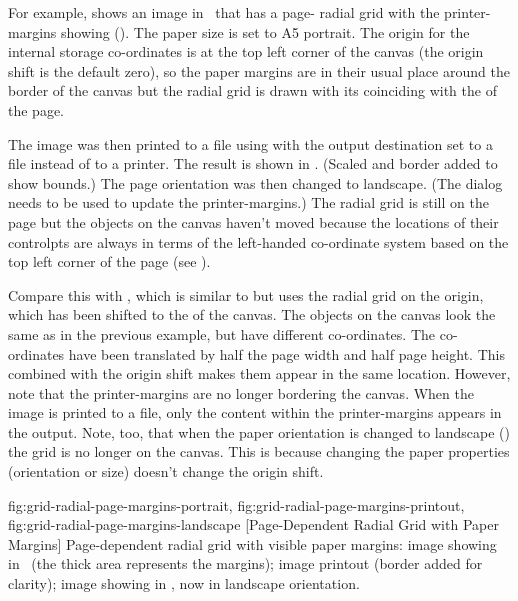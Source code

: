 For example,  shows an image
in \FlowframTk\ that has a page- radial grid with
the \glspl{printer-margin} showing ().
The paper size is set to A5 portrait.
The \gls{origin} for the internal storage co-ordinates is at the top
left corner of the \gls{canvas} (the origin shift is the
default zero), so the paper margins are in their
usual place around the border of the \gls{canvas} but the radial
grid is drawn with its  coinciding with the
 of the page.

The image was then printed to a file using  with
the output destination set to a file instead of to a printer.
The result is shown in
.
(Scaled and border added to show bounds.)
The page orientation was then changed to landscape.
(The  dialog needs to be used to update the 
\glspl{printer-margin}.) %
The radial grid is still  on the page but the
\glspl{object} on the \gls{canvas} haven't moved because the
locations of their \glspl{controlpt} are always in terms of the
left-handed co-ordinate system based on the top left corner of the
page (see ).

Compare this with , which
is similar to  but uses the
radial grid  on the \gls{origin}, which has been
shifted to the  of the \gls{canvas}. The
\glspl{object} on the \gls{canvas} look the same as in the previous
example, but have different co-ordinates. The co-ordinates have been
translated by half the page width and half page height. This
combined with the origin shift makes them appear in the same
location. However, note that the \glspl{printer-margin} are no
longer bordering the \gls{canvas}. When the image is printed to a
file, only the content within the \glspl{printer-margin} appears in
the output. Note, too, that when the paper orientation is changed to
landscape () the
grid is no longer  on the \gls{canvas}. This is
because changing the paper properties (orientation or size) doesn't
change the \gls{origin} shift.

{
  {fig:grid-radial-page-margins-portrait}{}{},
  {fig:grid-radial-page-margins-printout}{}{},
  {fig:grid-radial-page-margins-landscape}{}{}
}
[Page-Dependent Radial Grid with Paper Margins]
{Page-dependent radial grid with visible paper margins:
 image showing in
\FlowframTk\ (the thick  area represents the margins);
 image printout
(border added for clarity);
 image showing in
\FlowframTk, now in landscape orientation.}

